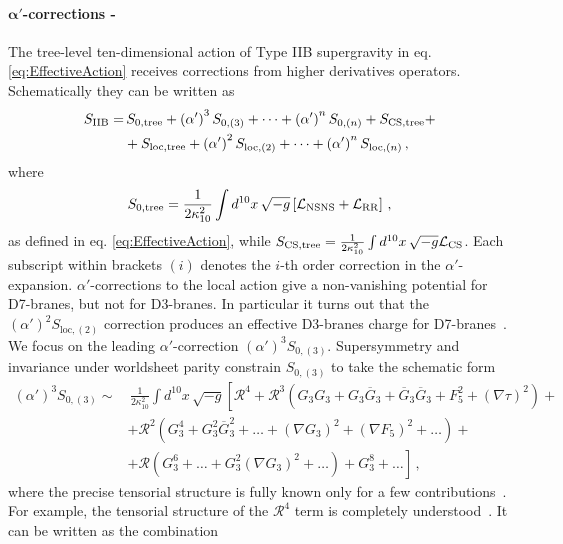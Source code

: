 \documentclass[12pt,a4paper]{book}
\newcommand\La{{\mathcal{L}}}
\begin{document}
\paragraph{$\mathbf{\alpha'}$-corrections - } The tree-level ten-dimensional action of Type IIB supergravity in eq. \eqref{eq:EffectiveAction} receives corrections from higher derivatives operators. Schematically they can be written as
\begin{align}
\label{eq:CorrectedEffectiveAction}
S_{\rm IIB} = &\, S_{0,\rm tree} + \left(\alpha'\right)^3 S_{0, (3)} + \dots + \left(\alpha'\right)^n S_{0, (n)} + S_{\text{CS}, \rm tree} + \nonumber \\
&+ S_{\rm loc, tree} + \left(\alpha'\right)^2 S_{\text{loc}, (2)} + \dots + \left(\alpha'\right)^n S_{\text{loc}, (n)} \,,
\end{align}
where
\begin{align}
\label{eq:EffectiveActionRRNSNS}
S_{0, \rm tree} = \frac{1}{2 \kappa_{10}^2} \int d^{10}x\,\sqrt{-g} \left[\La_{\rm NSNS} + \La_{\rm RR}\right]\,,
\end{align}
as defined in eq. \eqref{eq:EffectiveAction}, while $S_{\text{CS}, \rm tree} = \frac{1}{2 \kappa_{10}^2} \int d^{10}x\,\sqrt{-g} \La_{\rm CS}$. Each subscript within brackets $(i)$ denotes the $i$-th order correction in the $\alpha'$-expansion. $\alpha'$-corrections to the local action give a non-vanishing potential for D7-branes, but not for D3-branes. In particular it turns out that the $\left(\alpha'\right)^2 S_{\text{loc}, (2)}$ correction produces an effective D3-branes charge for D7-branes~\cite{Giddings:2001yu}. We focus on the leading $\alpha'$-correction $\left(\alpha'\right)^3 S_{0, (3)}$. Supersymmetry and invariance under worldsheet parity constrain $S_{0, (3)}$ to take the schematic form~\cite{Conlon:2005ki}
\begin{align}
\label{eq:LeadingAlphaAction}
\left(\alpha'\right)^3 S_{0, (3)} \sim&\, \frac{1}{2 \kappa_{10}^2} \int d^{10}x\,\sqrt{-g} \left[\mathcal{R}^4 + \mathcal{R}^3 \left(G_3 G_3 + G_3 \overline{G}_3 + \overline{G}_3 \overline{G}_3 + F_5^2 + \left(\nabla \tau\right)^2\right) + \right. \nonumber \\
&+ \mathcal{R}^2 \left(G_3^4 + G_3^2 \overline{G}_3^2 + \dots + \left(\nabla G_3\right)^2 + \left(\nabla F_5\right)^2 + \dots\right) + \nonumber \\
&\left. + \mathcal{R} \left(G_3^6 + \dots + G_3^2 \left(\nabla G_3\right)^2 + \dots\right) + G_3^8 + \dots \right] \,,
\end{align}
where the precise tensorial structure is fully known only for a few contributions~\cite{Kehagias:1997cq, Policastro:2006vt, Liu:2013dna}. For example, the tensorial structure of the $\mathcal{R}^4$ term is completely understood~\cite{Becker:2002nn, Antoniadis:1997eg}. It can be written as the combination
\end{document}

